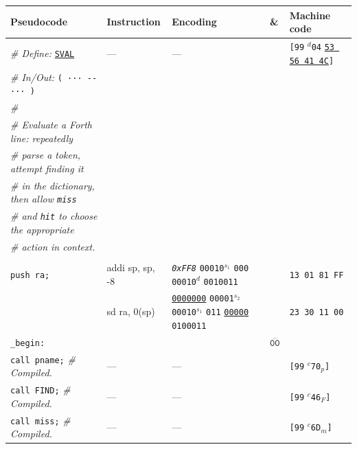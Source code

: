 \documentclass[a4paper,12pt,final]{article}
\begin{document}
\begin{table}[!htbp] \begin{adjustwidth}{-1cm}{-1cm} \fontsize{7}{8.400000}\selectfont
\begin{center}
\begin{tabular}{l|ll|l|l}
\textbf{Pseudocode} & \textbf{Instruction} & \textbf{Encoding} & \textbf{\&} & \textbf{Machine code}\\[0pt]
\hline
\emph{\# Define:} \uline{\texttt{SVAL}} & --- & --- &  & \texttt{[99} \(^{d}\)​\texttt{04} \uline{\texttt{53 56 41 4C}}​\texttt{]}\\[0pt]
\emph{\# In/Out:} \texttt{( ··· -{}-{} ··· )} &  &  &  & \\[0pt]
\emph{\#} &  &  &  & \\[0pt]
\emph{\# Evaluate a Forth line: repeatedly} &  &  &  & \\[0pt]
\emph{\# parse a token, attempt finding it} &  &  &  & \\[0pt]
\emph{\# in the dictionary, then allow \texttt{miss}} &  &  &  & \\[0pt]
\emph{\# and \texttt{hit} to choose the appropriate} &  &  &  & \\[0pt]
\emph{\# action in context.} &  &  &  & \\[0pt]
 &  &  &  & \\[0pt]
\hspace{1.053000em} \texttt{push ra;} & addi sp, sp, -8 & \emph{\texttt{0xFF8}}                    \texttt{00010}​\(^{s_{1}}\) \texttt{000} \texttt{00010}​\(^{d}\)  \texttt{0010011} &  & \texttt{13 01 81 FF}\\[0pt]
 & sd ra, 0(sp) & \uline{\texttt{0000000}} \texttt{00001}​\(^{s_{2}}\) \texttt{00010}​\(^{s_{1}}\) \texttt{011} \uline{\texttt{00000}} \texttt{0100011} &  & \texttt{23 30 11 00}\\[0pt]
\texttt{\_begin:} &  &  & \(\overline{\texttt{00}}\) & \\[0pt]
\hspace{1.053000em} \texttt{call pname;}  \hspace{0.000000em}​\emph{\# Compiled.} & --- & --- &  & \texttt{[99} \(^{c}\)​\texttt{70}​\(_{p}\)​\texttt{]}\\[0pt]
\hspace{1.053000em} \texttt{call FIND;}   \hspace{0.526500em}​\emph{\# Compiled.} & --- & --- &  & \texttt{[99} \(^{c}\)​\texttt{46}​\(_{F}\)​\texttt{]}\\[0pt]
\hspace{1.053000em} \texttt{call miss;}   \hspace{0.526500em}​\emph{\# Compiled.} & --- & --- &  & \texttt{[99} \(^{c}\)​\texttt{6D}​\(_{m}\)​\texttt{]}\\[0pt]

\end{tabular}
\end{center}
\end{adjustwidth}
\end{table}
\end{document}

